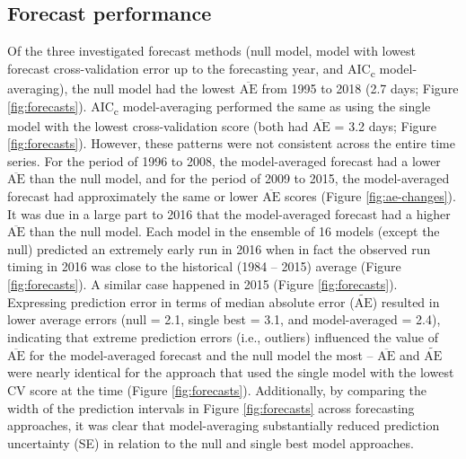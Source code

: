 \documentclass[12pt,]{book}
\theoremstyle{definition}
\theoremstyle{definition}
\theoremstyle{definition}
\theoremstyle{remark}
\begin{document}
\subsection{Forecast performance}\label{forecast-performance}

\noindent
Of the three investigated forecast methods (null model, model with
lowest forecast cross-validation error up to the forecasting year, and
AIC\textsubscript{c} model-averaging), the null model had the lowest
\(\overline{\text{AE}}\) from 1995 to 2018 (2.7 days; Figure
\ref{fig:forecasts}). AIC\textsubscript{c} model-averaging performed the
same as using the single model with the lowest cross-validation score
(both had \(\overline{\text{AE}}\) = 3.2 days; Figure
\ref{fig:forecasts}). However, these patterns were not consistent across
the entire time series. For the period of 1996 to 2008, the
model-averaged forecast had a lower \(\overline{\text{AE}}\) than the
null model, and for the period of 2009 to 2015, the model-averaged
forecast had approximately the same or lower \(\overline{\text{AE}}\)
scores (Figure \ref{fig:ae-changes}). It was due in a large part to 2016
that the model-averaged forecast had a higher \(\overline{\text{AE}}\)
than the null model. Each model in the ensemble of 16 models (except the
null) predicted an extremely early run in 2016 when in fact the observed
run timing in 2016 was close to the historical (1984 -- 2015) average
(Figure \ref{fig:forecasts}). A similar case happened in 2015 (Figure
\ref{fig:forecasts}). Expressing prediction error in terms of median
absolute error (\(\widetilde{\text{AE}}\)) resulted in lower average
errors (null = 2.1, single best = 3.1, and model-averaged = 2.4),
indicating that extreme prediction errors (i.e., outliers) influenced
the value of \(\overline{\text{AE}}\) for the model-averaged forecast
and the null model the most -- \(\overline{\text{AE}}\) and
\(\widetilde{\text{AE}}\) were nearly identical for the approach that
used the single model with the lowest CV score at the time (Figure
\ref{fig:forecasts}). Additionally, by comparing the width of the
prediction intervals in Figure \ref{fig:forecasts} across forecasting
approaches, it was clear that model-averaging substantially reduced
prediction uncertainty (SE) in relation to the null and single best
model approaches.
\end{document}
